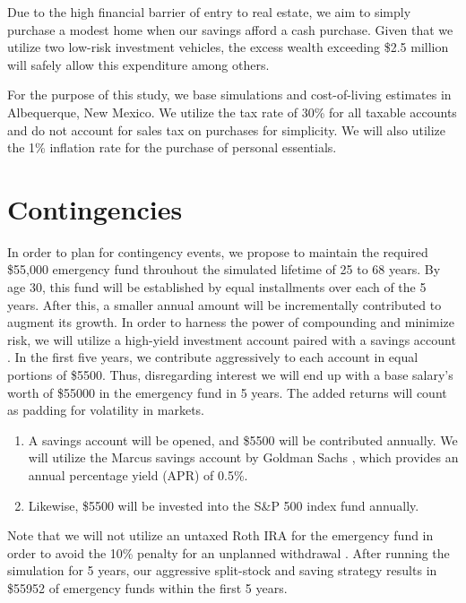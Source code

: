 \documentclass[12pt]{article}
\begin{document}
Due to the high financial barrier of
entry to real estate, we aim to simply purchase a modest home when our savings afford a cash purchase.
Given that we utilize two low-risk investment vehicles, the excess wealth exceeding \$2.5 million will
safely allow this expenditure among others.

For the purpose of this study, we base simulations and cost-of-living estimates in Albequerque, New Mexico.
We utilize the tax rate of 30\% for all taxable accounts and do not account for sales tax on purchases for simplicity.
We will also utilize the 1\% inflation rate for the purchase of personal essentials.

\section{Contingencies}

In order to plan for contingency events, we propose to maintain the required \$55,000 emergency
fund throuhout the simulated lifetime of 25 to 68 years. By age 30, this fund will be established
by equal installments over each of the 5 years. After this, a smaller annual amount will be incrementally contributed to augment its growth.
In order to harness the power of compounding and minimize risk, we will utilize a high-yield investment account
paired with a savings account \cite{SavingAcc}. In the first five years, we contribute aggressively to each account in equal portions of \$5500.
Thus, disregarding interest we will end up with a base salary's worth of \$55000 in the emergency fund in 5 years.
The added returns will count as padding for volatility in markets.

\begin{enumerate}
    \item A savings account will be opened, and \$5500 will be contributed annually.
    We will utilize the Marcus savings account by Goldman Sachs \cite{SavingAcc}, which provides an annual percentage yield (APR) \cite{SavingAcc} of 0.5\%.
    \item Likewise, \$5500 will be invested into the S\&P 500 index fund annually.
\end{enumerate}

Note that we will not utilize an untaxed Roth IRA for the emergency fund in order to avoid the 10\% penalty for an unplanned withdrawal \cite{RothIra}.
After running the simulation for 5 years, our aggressive split-stock and saving strategy results in \$55952 of emergency funds within the first 5 years.
\end{document}

